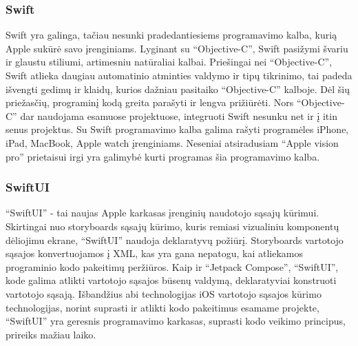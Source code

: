 \subsubsection{Swift}
Swift yra galinga, tačiau nesunki pradedantiesiems programavimo kalba, kurią Apple sukūrė savo įrenginiams. Lyginant su \enquote{Objective-C}, Swift pasižymi švariu ir glaustu stiliumi, artimesniu natūraliai kalbai. Priešingai nei \enquote{Objective-C}, Swift atlieka daugiau automatinio atminties valdymo ir tipų tikrinimo, tai padeda išvengti gedimų ir klaidų, kurios dažniau pasitaiko \enquote{Objective-C} kalboje. Dėl šių priežasčių, programinį kodą  greita parašyti ir lengva prižiūrėti. Nors \enquote{Objective-C} dar naudojama esamuose projektuose, integruoti Swift nesunku net ir į itin senus projektus. Su Swift programavimo kalba galima rašyti programėles iPhone, iPad, MacBook, Apple watch įrenginiams. Neseniai atsiradusiam \enquote{Apple vision pro} prietaisui irgi yra galimybė kurti programas šia programavimo kalba. 

\subsubsection{SwiftUI}

\enquote{SwiftUI} - tai naujas Apple karkasas įrenginių naudotojo sąsajų kūrimui. Skirtingai nuo storyboards sąsajų kūrimo, kuris remiasi vizualiniu komponentų dėliojimu ekrane, \enquote{SwiftUI} naudoja deklaratyvų požiūrį. Storyboards vartotojo sąsajos konvertuojamos į XML,  kas yra gana nepatogu, kai atliekamos programinio kodo pakeitimų peržiūros. Kaip ir \enquote{Jetpack Compose}, \enquote{SwiftUI}, kode galima atlikti vartotojo sąsajos būsenų valdymą, deklaratyviai konstruoti vartotojo sąsają. Išbandžius abi technologijas iOS vartotojo sąsajos kūrimo technologijas, norint suprasti ir atlikti kodo pakeitimus esamame projekte, \enquote{SwiftUI} yra geresnis programavimo karkasas, suprasti kodo veikimo principus, prireiks mažiau laiko.